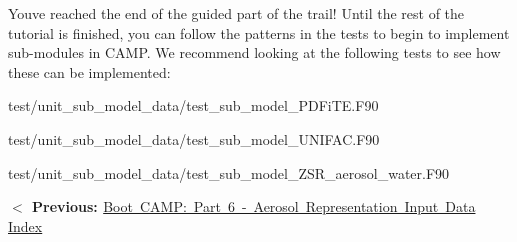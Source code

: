You\textquotesingle{}ve reached the end of the guided part of the trail! Until the rest of the tutorial is finished, you can follow the patterns in the tests to begin to implement sub-\/modules in CAMP. We recommend looking at the following tests to see how these can be implemented\+:


\begin{DoxyItemize}
\item {\ttfamily test/unit\+\_\+sub\+\_\+model\+\_\+data/test\+\_\+sub\+\_\+model\+\_\+\+PDFi\+TE.\+F90}
\item {\ttfamily test/unit\+\_\+sub\+\_\+model\+\_\+data/test\+\_\+sub\+\_\+model\+\_\+\+UNIFAC.\+F90}
\item {\ttfamily test/unit\+\_\+sub\+\_\+model\+\_\+data/test\+\_\+sub\+\_\+model\+\_\+\+ZSR\+\_\+aerosol\+\_\+water.\+F90}
\end{DoxyItemize}

 {\bfseries{ \texorpdfstring{$<$}{<} Previous\+: }} \mbox{\hyperlink{camp_tutorial_part_6}{Boot CAMP\+: Part 6 -\/ Aerosol Representation Input Data}}  \mbox{\hyperlink{camp_tutorial}{Index}}  